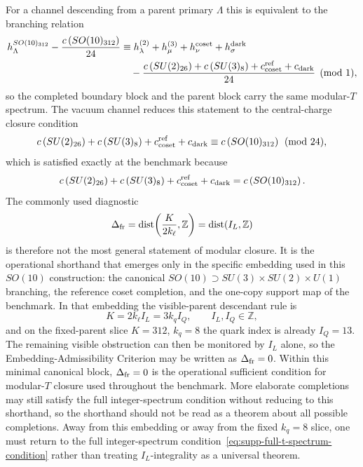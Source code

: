 \documentclass[11pt]{article}
\begin{document}
For a channel descending from a parent primary $\Lambda$ this is equivalent to
the branching relation
\begin{equation}
\begin{aligned}
 h_{\Lambda}^{SO(10)_{312}}-\frac{c\left(SO(10)_{312}\right)}{24}
 &\equiv h_{\lambda}^{(2)}+h_{\mu}^{(3)}+h_{\nu}^{\rm coset}+h_{\sigma}^{\rm dark} \\
 &\quad -\frac{c\left(SU(2)_{26}\right)+c\left(SU(3)_8\right)+c_{\rm coset}^{\rm ref}+c_{\rm dark}}{24}
 \pmod 1,
\end{aligned}
\end{equation}
so the completed boundary block and the parent block carry the same modular-$T$
spectrum. The vacuum channel reduces this statement to the central-charge
closure condition
\begin{equation}
 c\left(SU(2)_{26}\right)+c\left(SU(3)_8\right)+c_{\rm coset}^{\rm ref}+c_{\rm dark}
 \equiv
 c\left(SO(10)_{312}\right)
 \pmod{24},
\end{equation}
which is satisfied exactly at the benchmark because
\begin{equation}
 c\left(SU(2)_{26}\right)+c\left(SU(3)_8\right)+c_{\rm coset}^{\rm ref}+c_{\rm dark}
 = c\left(SO(10)_{312}\right).
\end{equation}
The commonly used diagnostic
\begin{equation}
 \Delta_{\rm fr}=\operatorname{dist}\!\left(\frac{K}{2k_{\ell}},\mathbb Z\right)
 =\operatorname{dist}(I_L,\mathbb Z)
\end{equation}
is therefore not the most general statement of modular closure. It is the
operational shorthand that emerges only in the specific embedding used in this
$SO(10)$ construction: the canonical
$SO(10)\supset SU(3)\times SU(2)\times U(1)$ branching, the reference coset
completion, and the one-copy support map of the benchmark. In that embedding the
visible-parent descendant rule is
\begin{equation}
 K=2k_{\ell}I_L=3k_qI_Q,
 \qquad
 I_L,I_Q\in\mathbb Z,
\end{equation}
and on the fixed-parent slice $K=312$, $k_q=8$ the quark index is already
$I_Q=13$. The remaining visible obstruction can then be monitored by $I_L$
alone, so the Embedding-Admissibility Criterion may be written as $\Delta_{\rm fr}=0$. Within this minimal canonical block, $\Delta_{\rm fr}=0$ is the operational sufficient condition for modular-$T$ closure used throughout the benchmark. More elaborate completions may still satisfy the full integer-spectrum condition without reducing to this shorthand, so the shorthand should not be read as a theorem about all possible completions.
Away from this embedding or away from the fixed $k_q=8$ slice, one must return
to the full integer-spectrum condition~\eqref{eq:supp-full-t-spectrum-condition}
rather than treating $I_L$-integrality as a universal theorem.
\end{document}
